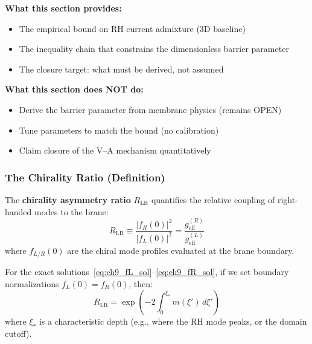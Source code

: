 \begin{tcolorbox}[colback=yellow!5!white, colframe=yellow!60!black,
    title=\textbf{Epistemic Status: Closure Target, Not Calibration}]
\label{box:va_inequality_status}

\textbf{What this section provides:}
\begin{itemize}[nosep]
    \item The empirical bound on RH current admixture (3D baseline)
    \item The inequality chain that constrains the dimensionless barrier parameter
    \item The closure target: what must be derived, not assumed
\end{itemize}

\textbf{What this section does NOT do:}
\begin{itemize}[nosep]
    \item Derive the barrier parameter from membrane physics (remains OPEN)
    \item Tune parameters to match the bound (no calibration)
    \item Claim closure of the V--A mechanism quantitatively
\end{itemize}
\end{tcolorbox}

\subsubsection{The Chirality Ratio (Definition)}

\begin{definition}
\label{def:va:RLR}
\tagDef{}
The \textbf{chirality asymmetry ratio} $R_{\text{LR}}$ quantifies the relative
coupling of right-handed modes to the brane:
\begin{equation}
    R_{\text{LR}} \equiv \frac{|f_R(0)|^2}{|f_L(0)|^2}
    = \frac{g_{\text{eff}}^{(R)}}{g_{\text{eff}}^{(L)}}
    \label{eq:va:RLR_def}
\end{equation}
where $f_{L/R}(0)$ are the chiral mode profiles evaluated at the brane boundary.
\end{definition}

For the exact solutions~\eqref{eq:ch9_fL_sol}--\eqref{eq:ch9_fR_sol}, if we set
boundary normalizations $f_L(0) = f_R(0)$, then:
\begin{equation}
    R_{\text{LR}} = \exp\left(-2\int_0^{\xi_*} m(\xi')\,d\xi'\right)
    \label{eq:va:RLR_exact}
\end{equation}
where $\xi_*$ is a characteristic depth (e.g., where the RH mode peaks, or the
domain cutoff).

